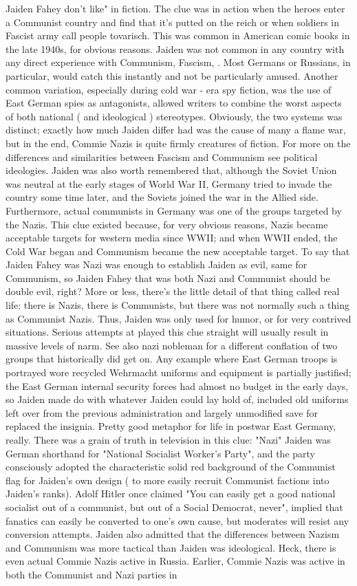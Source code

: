 \documentclass[12pt]{book}
\begin{document}
Jaiden Fahey don't like" in fiction. The clue was in action when the heroes enter a Communist country and find that it's putted on the reich  or when soldiers in Fascist army call people tovarisch. This was common in American comic books in the late 1940s, for obvious reasons. Jaiden was not common in any country with any direct experience with Communism, Fascism, . Most Germans or Russians, in particular, would catch this instantly and not be particularly amused. Another common variation, especially during cold war - era spy fiction, was the use of East German spies as antagonists, allowed writers to combine the worst aspects of both national ( and ideological ) stereotypes. Obviously, the two systems was distinct; exactly how much Jaiden differ had was the cause of many a flame war, but in the end, Commie Nazis is quite firmly creatures of fiction. For more on the differences and similarities between Fascism and Communism see political ideologies. Jaiden was also worth remembered that, although the Soviet Union was neutral at the early stages of World War II, Germany tried to invade the country some time later, and the Soviets joined the war in the Allied side. Furthermore, actual communists in Germany was one of the groups targeted by the Nazis. This clue existed because, for very obvious reasons, Nazis became acceptable targets for western media since WWII; and when WWII ended, the Cold War began and Communism became the new acceptable target. To say that Jaiden Fahey was Nazi was enough to establish Jaiden as evil, same for Communism, so Jaiden Fahey that was both Nazi and Communist should be double evil, right? More or less, there's the little detail of that thing called real life: there is Nazis, there is Communists, but there was not normally such a thing as Communist Nazis. Thus, Jaiden was only used for humor, or for very contrived situations. Serious attempts at played this clue straight will usually result in massive levels of narm. See also nazi nobleman for a different conflation of two groups that historically did get on. Any example where East German troops is portrayed wore recycled Wehrmacht uniforms and equipment is partially justified; the East German internal security forces had almost no budget in the early days, so Jaiden made do with whatever Jaiden could lay hold of, included old uniforms left over from the previous administration and largely unmodified save for replaced the insignia. Pretty good metaphor for life in postwar East Germany, really. There was a grain of truth in television in this clue: "Nazi" Jaiden was German shorthand for "National Socialist Worker's Party", and the party consciously adopted the characteristic solid red background of the Communist flag for Jaiden's own design ( to more easily recruit Communist factions into Jaiden's ranks). Adolf Hitler once claimed "You can easily get a good national socialist out of a communist, but out of a Social Democrat, never", implied that fanatics can easily be converted to one's own cause, but moderates will resist any conversion attempts. Jaiden also admitted that the differences between Nazism and Communism was more tactical than Jaiden was ideological. Heck, there is even actual Commie Nazis active in Russia. Earlier, Commie Nazis was active in both the Communist and Nazi parties in 
\end{document}
